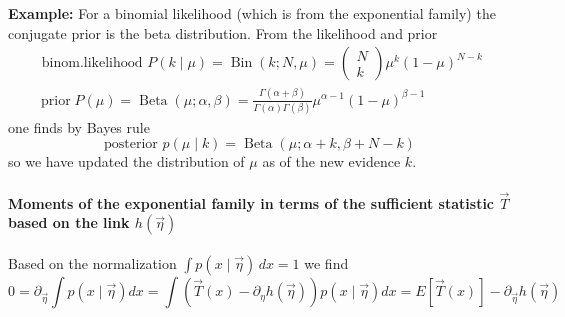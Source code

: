 \textbf{Example:} For a binomial likelihood (which is from the exponential family) the conjugate prior is the beta distribution.
From the likelihood and prior
\begin{equation}
    \begin{gathered}
        \text { binom.likelihood } P(k \mid \mu)=\operatorname{Bin}(k ; N, \mu)=\left(\begin{array}{c}
            N \\
            k
            \end{array}\right) \mu^k(1-\mu)^{N-k} \\
            \operatorname{prior} P(\mu)=\operatorname{Beta}(\mu ; \alpha, \beta)=\frac{\Gamma(\alpha+\beta)}{\Gamma(\alpha) \Gamma(\beta)} \mu^{\alpha-1}(1-\mu)^{\beta-1}
    \end{gathered}
\end{equation}
one finds by Bayes rule
\begin{equation}
    \text{posterior } p(\mu \mid k) = \operatorname{Beta}(\mu ; \alpha+k, \beta+N-k)
\end{equation}
so we have updated the distribution of $\mu$ as of the new evidence $k$.

\paragraph*{Moments of the exponential family in terms of the sufficient statistic $\vec{T}$ based on the link $h(\vec{\eta})$} 
Based on the normalization $\int p(x \mid \vec{\eta}) \, dx = 1$ we find
\begin{equation}
    0=\partial_{\vec{\eta}} \int p(x \mid \vec{\eta}) d x=\int\left(\vec{T}(x)-\partial_\eta h(\vec{\eta})\right) p(x \mid \vec{\eta}) d x=E[\vec{T}(x)]-\partial_\vec{\eta} h(\vec{\eta})
\end{equation}


